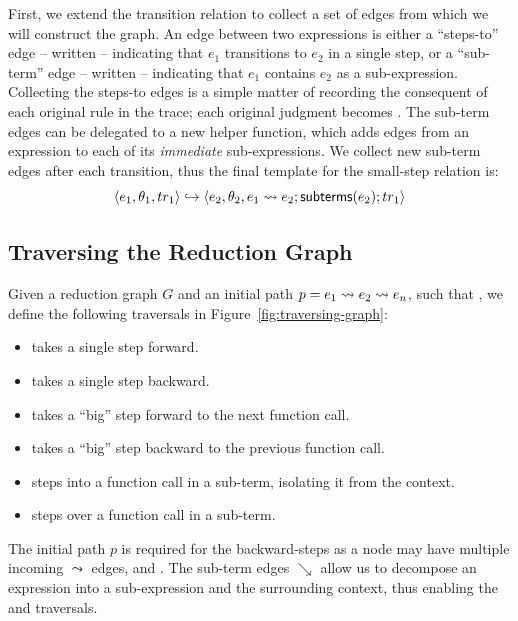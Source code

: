 First, we extend the transition relation to collect a set of edges from
which we will construct the graph.
%
An edge between two expressions is either a ``steps-to'' edge -- written
 -- indicating that $e_1$ transitions to $e_2$ in a
single step, or a ``sub-term'' edge -- written  --
indicating that $e_1$ contains $e_2$ as a sub-expression.
%
Collecting the steps-to edges is a simple matter of recording the
consequent of each original rule in the trace; each original judgment
 becomes
.
%
The sub-term edges can be delegated to a new \subtermssym helper
function, which adds edges from an expression to each of its
\emph{immediate} sub-expressions.
%
We collect new sub-term edges after each transition, thus the final
template for the small-step relation is:
\[
\langle e_1, \theta_1, tr_1 \rangle \hookrightarrow \langle e_2, \theta_2, e_1 \leadsto e_2; \mathsf{subterms}(e_2); tr_1 \rangle
\]

\subsection{Traversing the Reduction Graph}
\label{sec:traversing-graph}
Given a reduction graph $G$ and an initial path
$p = e_1 \leadsto e_2 \leadsto e_n$, such that
, we define the following
traversals in Figure~\ref{fig:traversing-graph}:
%
\begin{itemize}
\item \stepforwardsym takes a single step forward.
\item \stepbackwardsym takes a single step backward.
\item \jumpforwardsym takes a ``big'' step forward to the next function call.
\item \jumpbackwardsym takes a ``big'' step backward to the previous function call.
\item \stepintosym steps into a function call in a sub-term, isolating it from the context.
\item \stepoversym steps over a function call in a sub-term.
\end{itemize}
%
The initial path $p$ is required for the backward-steps as a node may
have multiple incoming $\leadsto$ edges, \eg
{} and .
%
The sub-term edges $\searrow$ allow us to decompose an expression into a
sub-expression and the surrounding context, thus enabling the \stepintosym
and \stepoversym traversals.

